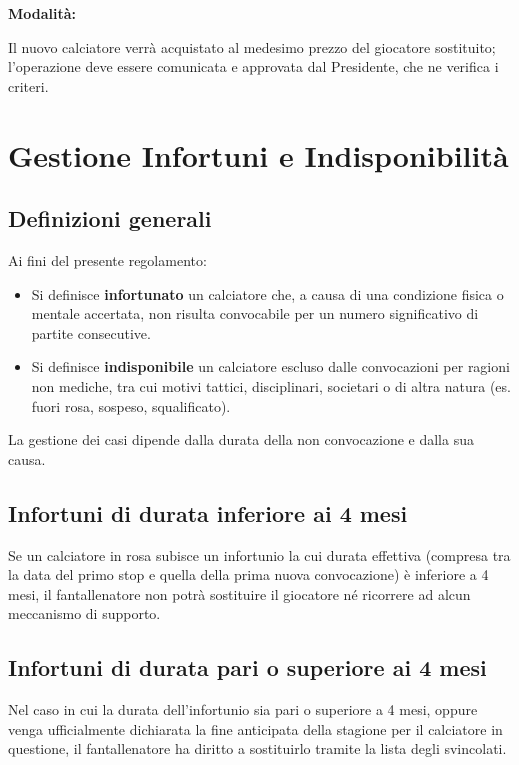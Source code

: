\noindent \textbf{Modalità:}

Il nuovo calciatore verrà acquistato al medesimo prezzo del giocatore sostituito; l’operazione deve essere comunicata e approvata dal Presidente, che ne verifica i criteri.



\chapter{Gestione Infortuni e Indisponibilità}
\label{cap:gestione-infortuni}

\section{Definizioni generali}
\label{art:6.1}

\noindent
Ai fini del presente regolamento:

\begin{itemize}
  \item Si definisce \textbf{infortunato} un calciatore che, a causa di una condizione fisica o mentale accertata, non risulta convocabile per un numero significativo di partite consecutive.
  \item Si definisce \textbf{indisponibile} un calciatore escluso dalle convocazioni per ragioni non mediche, tra cui motivi tattici, disciplinari, societari o di altra natura (es. fuori rosa, sospeso, squalificato).
\end{itemize}

\noindent
La gestione dei casi dipende dalla durata della non convocazione e dalla sua causa.

\section{Infortuni di durata inferiore ai 4 mesi}
\label{art:6.2}

Se un calciatore in rosa subisce un infortunio la cui durata effettiva (compresa tra la data del primo stop e quella della prima nuova convocazione) è inferiore a 4 mesi, il fantallenatore non potrà sostituire il giocatore né ricorrere ad alcun meccanismo di supporto.

\section{Infortuni di durata pari o superiore ai 4 mesi}
\label{art:6.3}

Nel caso in cui la durata dell’infortunio sia pari o superiore a 4 mesi, oppure venga ufficialmente dichiarata la fine anticipata della stagione per il calciatore in questione, il fantallenatore ha diritto a sostituirlo tramite la lista degli svincolati.

